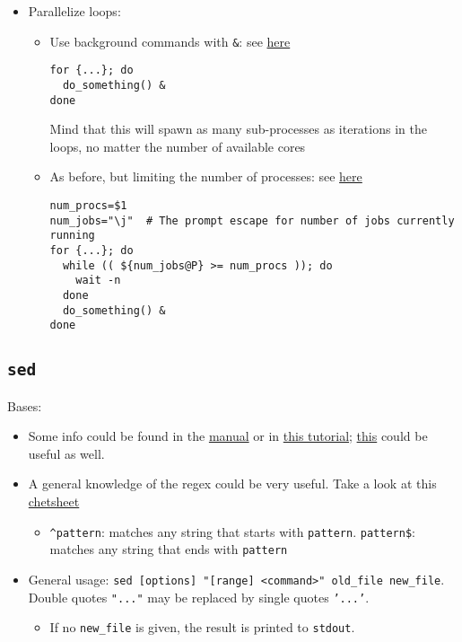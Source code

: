 \documentclass[a4paper,12pt,%
              final%
              ]{article}
\begin{document}
\begin{itemize}
  \item Parallelize loops:
    \begin{itemize}
      \item Use background commands with \verb|&|: see \href{https://unix.stackexchange.com/questions/103920/parallelize-a-bash-for-loop/103922}{here}
\begin{verbatim}
for {...}; do
  do_something() &
done
\end{verbatim}
        Mind that this will spawn as many sub-processes as iterations in the loops, no matter the number of available cores
      \item As before, but limiting the number of processes: see \href{https://stackoverflow.com/questions/38774355/how-to-parallelize-for-loop-in-bash-limiting-number-of-processes}{here}
\begin{verbatim}
num_procs=$1
num_jobs="\j"  # The prompt escape for number of jobs currently running
for {...}; do
  while (( ${num_jobs@P} >= num_procs )); do
    wait -n
  done
  do_something() &
done
\end{verbatim}
    \end{itemize}
\end{itemize}

\subsection{\texttt{sed}}
Bases:
\begin{itemize}
  \item Some info could be found in the \href{https://www.gnu.org/software/sed/manual/sed.html}{manual} or in \href{http://www.grymoire.com/Unix/Sed.html}{this tutorial}; \href{https://www.tutorialspoint.com/unix/unix-regular-expressions.htm}{this} could be useful as well.
  \item A general knowledge of the regex could be very useful. Take a look at this \href{https://medium.com/factory-mind/regex-tutorial-a-simple-cheatsheet-by-examples-649dc1c3f285}{chetsheet}
    \begin{itemize}
      \item \verb|^pattern|: matches any string that starts with \texttt{pattern}. \verb|pattern$|: matches any string that ends with \texttt{pattern}
    \end{itemize}
  \item General usage: \verb|sed [options] "[range] <command>" old_file new_file|. Double quotes \texttt{"..."} may be replaced by single quotes \texttt{'...'}.
    \begin{itemize}
      \item If no \verb|new_file| is given, the result is printed to \texttt{stdout}.
    \end{itemize}
\end{itemize}
\end{document}
